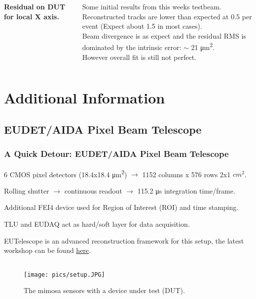 \documentclass{beamer}
\begin{document}
\begin{frame}
\begin{columns}[t]
\tiny{\textbf{Residual on DUT for local X axis.}}

\tiny{
\vspace{10pt}
Some initial results from this weeks testbeam. \\
\vspace{10pt}
Reconstructed tracks are lower than expected at 0.5 per event (Expect about 1.5 in most cases).\\
\vspace{10pt}
Beam divergence is as expect and the residual RMS is dominated by the intrinsic error: $\sim$ 21 \si{\micro\metre\squared}.\\
\vspace{10pt}
However overall fit is still not perfect.
}

\end{columns}
\end{frame}


\section{Additional Information}
\subsection{EUDET/AIDA Pixel Beam Telescope}
\begin{frame}
\frametitle{ A Quick Detour: EUDET/AIDA Pixel Beam Telescope}
\begin{itemize}
\small{
\item 6 CMOS pixel detectors (18.4x18.4 \si{\micro\metre\squared}) $\rightarrow$ 1152 columns x 576 rows 2x1 $cm^2$.
\item Rolling shutter $\rightarrow$ continuous readout $\rightarrow$ 115.2 \si{\micro\second} integration time/frame.
\item Additional FEI4 device used for Region of Interest (ROI) and time stamping.
\item TLU and EUDAQ act as hard/soft layer for data acquisition.
\item EUTelescope is an advanced reconstruction framework for this setup, the latest workshop can be found \href{https://indico.desy.de/conferenceDisplay.py?ovw=True&confId=10685}{here}.
}
\end{itemize}
\begin{figure}
  \begin{columns}
        \texttt{[image: pics/setup.JPG]}
        \label{fig:example left}
        \caption{The mimosa sensors with a device under test (DUT).}
      \end{columns}
\end{figure}
\end{frame}
\end{document}
